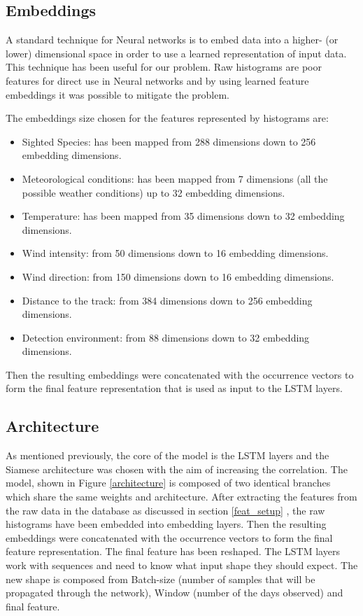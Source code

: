 \subsection{Embeddings}\label{embeddings_section}
A standard technique for Neural networks is to embed data into a higher- (or lower) dimensional space in order to use a learned representation of input data. 
This technique has been useful for our problem. Raw histograms are poor features for direct use in Neural networks and by using learned feature embeddings it was possible to mitigate the problem.

The embeddings size chosen for the features represented by histograms are:

\begin{itemize}
    \item Sighted Species: has been mapped from 288 dimensions down to 256 embedding dimensions.
    \item Meteorological conditions: has been mapped from 7 dimensions (all the possible weather conditions) up to 32 embedding dimensions.
    \item Temperature: has been mapped from 35 dimensions down to 32 embedding dimensions.
    \item Wind intensity: from 50 dimensions down to 16 embedding dimensions.
    \item Wind direction: from 150 dimensions down to 16 embedding dimensions.
    \item Distance to the track: from 384 dimensions down to 256 embedding dimensions.
    \item Detection environment: from 88 dimensions down to 32 embedding dimensions.
\end{itemize}
Then the resulting embeddings were concatenated with the occurrence vectors to form the final feature representation that is used as input to the LSTM layers.

\subsection{Architecture}
As mentioned previously, the core of the model is the LSTM layers and the Siamese architecture was chosen with the aim of increasing the correlation.
The model, shown in Figure \ref{architecture} is composed of two identical branches which share the same weights and architecture.
After extracting the features from the raw data in the database as discussed in section \ref{feat_setup} , the raw histograms have been embedded into embedding layers.
Then the resulting embeddings were concatenated with the occurrence vectors to form the final feature representation.
The final feature has been reshaped. The LSTM layers work with sequences and need to know what input shape they should expect.
The new shape is composed from Batch-size (number of samples that will be propagated through the network), Window (number of the days observed) and final feature.

